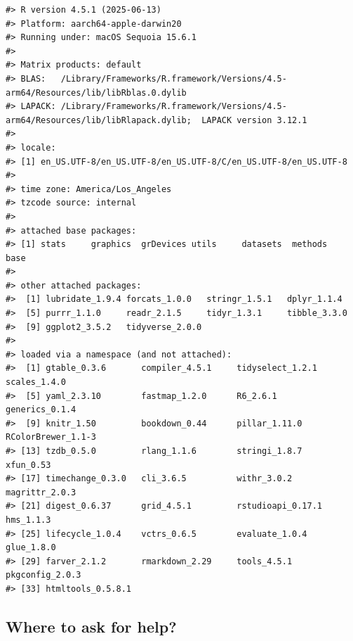 \documentclass[
]{book}
\begin{document}
\begin{verbatim}
#> R version 4.5.1 (2025-06-13)
#> Platform: aarch64-apple-darwin20
#> Running under: macOS Sequoia 15.6.1
#> 
#> Matrix products: default
#> BLAS:   /Library/Frameworks/R.framework/Versions/4.5-arm64/Resources/lib/libRblas.0.dylib 
#> LAPACK: /Library/Frameworks/R.framework/Versions/4.5-arm64/Resources/lib/libRlapack.dylib;  LAPACK version 3.12.1
#> 
#> locale:
#> [1] en_US.UTF-8/en_US.UTF-8/en_US.UTF-8/C/en_US.UTF-8/en_US.UTF-8
#> 
#> time zone: America/Los_Angeles
#> tzcode source: internal
#> 
#> attached base packages:
#> [1] stats     graphics  grDevices utils     datasets  methods   base     
#> 
#> other attached packages:
#>  [1] lubridate_1.9.4 forcats_1.0.0   stringr_1.5.1   dplyr_1.1.4    
#>  [5] purrr_1.1.0     readr_2.1.5     tidyr_1.3.1     tibble_3.3.0   
#>  [9] ggplot2_3.5.2   tidyverse_2.0.0
#> 
#> loaded via a namespace (and not attached):
#>  [1] gtable_0.3.6       compiler_4.5.1     tidyselect_1.2.1   scales_1.4.0      
#>  [5] yaml_2.3.10        fastmap_1.2.0      R6_2.6.1           generics_0.1.4    
#>  [9] knitr_1.50         bookdown_0.44      pillar_1.11.0      RColorBrewer_1.1-3
#> [13] tzdb_0.5.0         rlang_1.1.6        stringi_1.8.7      xfun_0.53         
#> [17] timechange_0.3.0   cli_3.6.5          withr_3.0.2        magrittr_2.0.3    
#> [21] digest_0.6.37      grid_4.5.1         rstudioapi_0.17.1  hms_1.1.3         
#> [25] lifecycle_1.0.4    vctrs_0.6.5        evaluate_1.0.4     glue_1.8.0        
#> [29] farver_2.1.2       rmarkdown_2.29     tools_4.5.1        pkgconfig_2.0.3   
#> [33] htmltools_0.5.8.1
\end{verbatim}

\subsection{Where to ask for help?}\label{where-to-ask-for-help}
\end{document}

